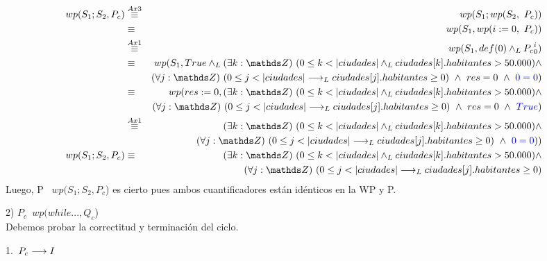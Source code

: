 \documentclass[10pt,a4paper,fleqn]{article}
\begin{document}
\begin{eqnarray}
    wp(S_1;S_2, P_c) &\overset{Ax3}{\equiv}& wp(S_1; wp(S_2,\ P_c))  \notag \\
    &\equiv& wp(S_1, wp(i:=0,\ P_c)) \notag \\
    &\overset{Ax1}{\equiv}& wp(S_1, def(0) \yLuego \text{$P_c$}_{0}^{i}) \notag \\
    &\equiv& wp(S_1, True \yLuego \existe[unalinea]{k}{\ent}{0 \leq k< |ciudades| \yLuego ciudades[k].habitantes >  50.000 }\land \notag \\ & & \paraTodo[unalinea]{j}{\ent}{0\leq j < |ciudades| \implicaLuego ciudades[j].habitantes \geq 0}\ \land \ res=0\ \land \ \textcolor{blue}{0=0}) \notag \\
     &\equiv& wp(res:= 0, \existe[unalinea]{k}{\ent}{0 \leq k< |ciudades| \yLuego ciudades[k].habitantes >  50.000 }\land \notag \\ & & \paraTodo[unalinea]{j}{\ent}{0\leq j < |ciudades| \implicaLuego ciudades[j].habitantes \geq 0}\ \land \ res=0\ \land \ \textcolor{blue}{True}) \notag \\
     &\overset{Ax1}{\equiv}& \existe[unalinea]{k}{\ent}{0 \leq k< |ciudades| \yLuego ciudades[k].habitantes >  50.000 }\land \notag \\ & & \paraTodo[unalinea]{j}{\ent}{0\leq j < |ciudades| \implicaLuego ciudades[j].habitantes \geq 0}\ \land \ \textcolor{blue}{0=0})) \notag \\
       wp(S_1;S_2, P_c) &\equiv& \existe[unalinea]{k}{\ent}{0 \leq k< |ciudades| \yLuego ciudades[k].habitantes >  50.000 }\land \notag \\ & & \paraTodo[unalinea]{j}{\ent}{0\leq j < |ciudades| \implicaLuego ciudades[j].habitantes \geq 0} \notag 
\end{eqnarray}
Luego, P \implica \ $wp(S_1;S_2, P_c$) es cierto pues ambos cuantificadores están idénticos en la WP y P. 

\item 2) $P_c$\implica \ $wp(while...,Q_c$)\\
Debemos probar la correctitud y terminación del ciclo.
\item 1.\ $P_c\longrightarrow I$ \\
\end{document}
